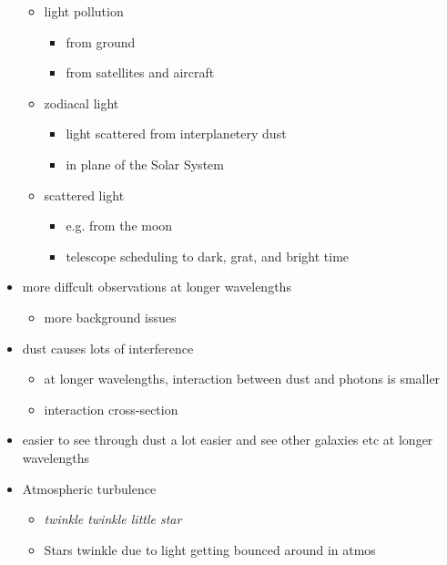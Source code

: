 \documentclass[a4paper,11pt,normalem]{article}
\begin{document}
\begin{itemize}
        \begin{itemize}
            \item light pollution
                \begin{itemize}
                    \item from ground
                    \item from satellites and aircraft
                \end{itemize}
            \item zodiacal light
                \begin{itemize}
                    \item light scattered from interplanetery dust
                    \item in plane of the Solar System
                \end{itemize}
            \item scattered light
                \begin{itemize}
                    \item e.g. from the moon
                    \item telescope scheduling to dark, grat, and bright time
                \end{itemize}
        \end{itemize}
    \item more diffcult observations at longer wavelengths
        \begin{itemize}
            \item more background issues
        \end{itemize}
    \item dust causes lots of interference
        \begin{itemize}
            \item at longer wavelengths, interaction between dust and photons is smaller
            \item interaction cross-section
        \end{itemize}
    \item easier to see through dust a lot easier and see other galaxies etc at longer wavelengths
    \item Atmospheric turbulence
        \begin{itemize}
            \item \emph{twinkle twinkle little star}
            \item Stars twinkle due to light getting bounced around in atmos
        \end{itemize}

\end{itemize}
\end{document}
